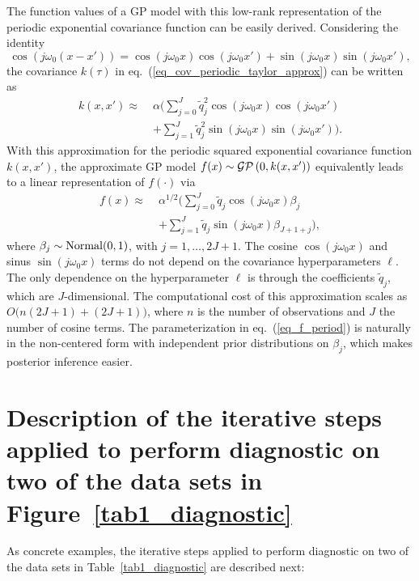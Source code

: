 The function values of a GP model with this low-rank representation of the periodic exponential covariance function can be easily derived. Considering the identity
%
\begin{equation*}
\cos(j\omega_0 (x-x'))=\cos(j\omega_0 x) \cos(j\omega_0 x') + \sin(j\omega_0 x) \sin(j\omega_0 x'),
\end{equation*}
the covariance $k(\tau)$ in eq.~(\ref{eq_cov_periodic_taylor_approx}) can be written as
%
\begin{align} \label{eq_cov_periodic_taylor_approx_2}
k(x,x')\approx \; & \alpha \bigg( \sum_{j=0}^{J} \tilde{q}_j^2 \cos(j\omega_0 x)  \cos(j\omega_0 x')  \nonumber\\
& + \sum_{j=1}^{J} \tilde{q}_j^2 \sin(j\omega_0 x) \sin(j\omega_0 x') \bigg).
\end{align}
With this approximation for the periodic squared exponential covariance function $k(x,x')$, the approximate GP model $f(x) \sim \operatorname{\mathcal{GP}}\left(0,k(x,x')\right)$ equivalently leads to a linear representation of $f(\cdot)$ via
%
\begin{align} \label{eq_f_period}
f(x) \approx \; & \alpha^{1/2} \bigg( \sum_{j=0}^J  \tilde{q}_j \cos(j\omega_0 x) \beta_j \nonumber\\
& +  \sum_{j=1}^J \tilde{q}_j \sin(j\omega_0 x) \beta_{J+1+j} \bigg),
\end{align}
where $\beta_j \sim \operatorname{Normal}(0,1)$, with $j=1,\dots,2J+1$. The cosine $\cos(j\omega_0 x)$ and sinus $\sin(j\omega_0 x)$ terms do not depend on the covariance hyperparameters $\ell$. The only dependence on the hyperparameter $\ell$ is through the coefficients $\tilde{q}_j$, which are $J$-dimensional. The computational cost of this approximation scales as $O\big(n(2J+1) + (2J+1)\big)$, where $n$ is the number of observations and $J$ the number of cosine terms.
The parameterization in eq.~(\ref{eq_f_period}) is naturally in the non-centered form with independent prior distributions on
$\beta_j$, which makes posterior inference easier.

\section{Description of the iterative steps applied to perform diagnostic on two of the data sets in Figure~\ref{tab1_diagnostic}}\label{sec_ex_iterative_steps}

As concrete examples, the iterative steps applied to perform diagnostic on two of the data sets in Table~\ref{tab1_diagnostic} are described next:

